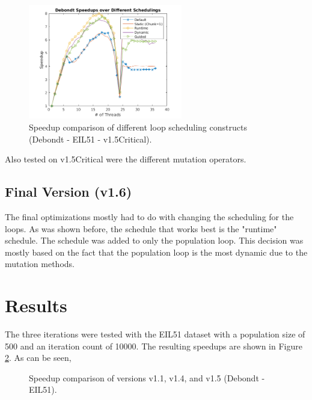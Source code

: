 \documentclass[10pt,letterpaper]{article}
\begin{document}
\begin{figure}
\centering
\includegraphics[width=0.6\textwidth]{../img/debondt_schedulers.png} 
\caption{Speedup comparison of different loop scheduling constructs (Debondt - EIL51 - v1.5Critical).}
\label{fig:schedules}
\end{figure}

Also tested on v1.5Critical were the different mutation operators. 


\subsection{Final Version (v1.6)} 
The final optimizations mostly had to do with changing the scheduling for the loops. As was shown before, the schedule that works best is the "runtime" schedule. The schedule was added to only the population loop. This decision was mostly based on the fact that the population loop is the most dynamic due to the mutation methods.

\section{Results} \label{sec:results}
The three iterations were tested with the EIL51 dataset with a population size of 500 and an iteration count of 10000. The resulting speedups are shown in Figure \ref{fig:versions}. As can be seen, %

\begin{figure}
\centering
\caption{Speedup comparison of versions v1.1, v1.4, and v1.5 (Debondt - EIL51).}
\label{fig:versions}
\end{figure}
\end{document}
